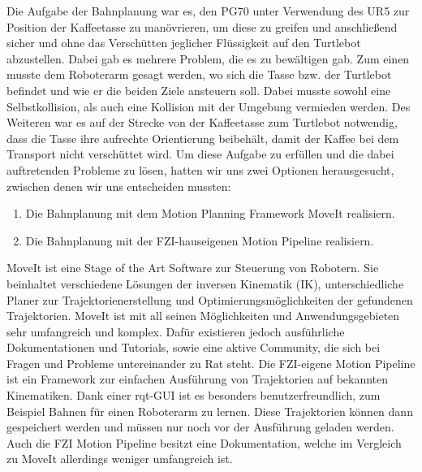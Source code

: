 Die Aufgabe der Bahnplanung war es, den PG70 unter Verwendung des UR5 zur Position der Kaffeetasse zu manövrieren, um diese zu greifen und anschließend sicher und ohne das Verschütten jeglicher Flüssigkeit auf den Turtlebot abzustellen. Dabei gab es mehrere Problem, die es zu bewältigen gab.
\newline
Zum einen musste dem Roboterarm gesagt werden, wo sich die Tasse bzw. der Turtlebot befindet und wie er die beiden Ziele ansteuern soll. Dabei musste sowohl eine Selbstkollision, als auch eine Kollision mit der Umgebung vermieden werden. Des Weiteren war es auf der Strecke von der Kaffeetasse zum Turtlebot notwendig, dass die Tasse ihre aufrechte Orientierung beibehält, damit der Kaffee bei dem Transport nicht verschüttet wird.
\newline
Um diese Aufgabe zu erfüllen und die dabei auftretenden Probleme zu lösen, hatten wir uns zwei Optionen herausgesucht, zwischen denen wir uns entscheiden mussten:
\begin{enumerate}
	\item Die Bahnplanung mit dem Motion Planning Framework MoveIt \cite{MoveIt} realisiern.
	\item Die Bahnplanung mit der FZI-hauseigenen Motion Pipeline \cite{FZIPipeline} realisiern.
\end{enumerate}
MoveIt ist eine Stage of the Art Software zur Steuerung von Robotern. Sie beinhaltet verschiedene Lösungen der inversen Kinematik (IK), unterschiedliche Planer zur Trajektorienerstellung und Optimierungsmöglichkeiten der gefundenen Trajektorien. MoveIt ist mit all seinen Möglichkeiten und Anwendungsgebieten sehr umfangreich und komplex. Dafür existieren jedoch ausführliche Dokumentationen und Tutorials, sowie eine aktive Community, die sich bei Fragen und Probleme untereinander zu Rat steht.
\newline
Die FZI-eigene Motion Pipeline ist ein Framework zur einfachen Ausführung von Trajektorien auf bekannten Kinematiken. Dank einer rqt-GUI ist es besonders benutzerfreundlich, zum Beispiel Bahnen für einen Roboterarm zu lernen. Diese Trajektorien können dann gespeichert werden und müssen nur noch vor der Ausführung geladen werden. Auch die FZI Motion Pipeline besitzt eine Dokumentation, welche im Vergleich zu MoveIt allerdings weniger umfangreich ist.
